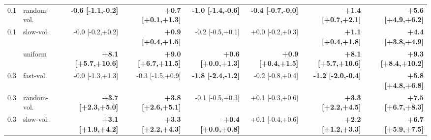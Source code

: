 \begin{table}[t]
\begin{tabular}{llrrrrrr}
0.1 & random-vol. & \textbf{-0.6 [-1.1,-0.2]} & \textbf{+0.7 [+0.1,+1.3]} & \textbf{-1.0 [-1.4,-0.6]} & \textbf{-0.4 [-0.7,-0.0]} & \textbf{+1.4 [+0.7,+2.1]} & \textbf{+5.6 [+4.9,+6.2]}\\
0.1 & slow-vol. & -0.0 [-0.2,+0.2] & \textbf{+0.9 [+0.4,+1.5]} & -0.2 [-0.5,+0.1] & +0.0 [-0.2,+0.3] & \textbf{+1.1 [+0.4,+1.8]} & \textbf{+4.4 [+3.8,+4.9]}\\
\addlinespace[2pt]
0.3 & uniform & \textbf{+8.1 [+5.7,+10.6]} & \textbf{+9.0 [+6.7,+11.5]} & \textbf{+0.6 [+0.0,+1.3]} & \textbf{+0.9 [+0.4,+1.5]} & \textbf{+8.1 [+5.7,+10.6]} & \textbf{+9.3 [+8.4,+10.2]}\\
0.3 & fast-vol. & -0.0 [-1.3,+1.3] & -0.3 [-1.5,+0.9] & \textbf{-1.8 [-2.4,-1.2]} & -0.2 [-0.8,+0.4] & \textbf{-1.2 [-2.0,-0.4]} & \textbf{+5.8 [+4.8,+6.8]}\\
0.3 & random-vol. & \textbf{+3.7 [+2.3,+5.0]} & \textbf{+3.8 [+2.6,+5.1]} & -0.1 [-0.5,+0.3] & +0.1 [-0.3,+0.6] & \textbf{+3.3 [+2.2,+4.5]} & \textbf{+7.5 [+6.7,+8.3]}\\
0.3 & slow-vol. & \textbf{+3.1 [+1.9,+4.2]} & \textbf{+3.3 [+2.2,+4.3]} & \textbf{+0.4 [+0.0,+0.8]} & +0.1 [-0.4,+0.6] & \textbf{+2.2 [+1.2,+3.3]} & \textbf{+6.7 [+5.9,+7.5]}\\
\bottomrule\end{tabular}\end{table}